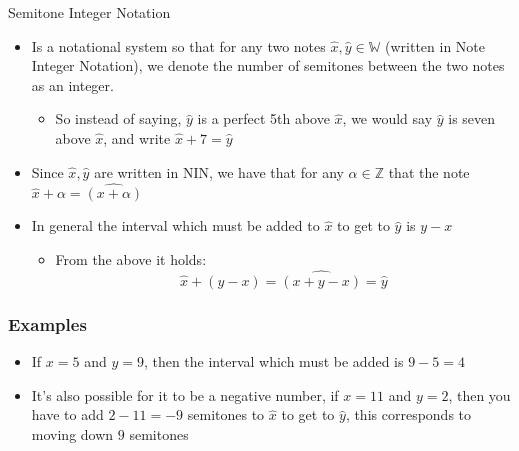 \documentclass{standalone}
\begin{document}
\begin{defn*}{Semitone Integer Notation}
  \begin{itemize}
    \item Is a notational system so that for any two notes $\widehat{x}, \widehat{y} \in \mathbb{W}$ (written in Note Integer Notation), we denote the number of semitones between the two notes as an integer. 
      \begin{itemize}
        \item So instead of saying, $\widehat{y}$ is a perfect 5th above $\widehat{x}$, we would say $\widehat{y}$ is seven above $\widehat{x}$, and write $\widehat{x}  +  7 = \widehat{y}$ 
      \end{itemize}
  \item Since $\widehat{x}, \widehat{y}$ are written in NIN, we have that for any $\alpha \in \mathbb{Z}$ that the note $\widehat{x}  +  \alpha = \widehat{\left( x  +  \alpha \right)}$ 
    \item In general the interval which must be added to $\widehat{x}$ to get to $\widehat{y}$ is $y - x$ 
      \begin{itemize}
        \item From the above it holds: 
          \[
            \widehat{x}  +  \left( y  -  x \right) = \widehat{\left( x  +  y  - x \right)} = \widehat{y}
          \]
      \end{itemize}
  \end{itemize}
    \subsubsection*{Examples}
    \begin{itemize}
      \item If $x = 5$ and $y = 9$, then the interval which must be added is $9 - 5 = 4$ 
      \item It's also possible for it to be a negative number, if $x = 11$ and $y = 2$, then you have to add $2  -  11 = -9$ semitones to $\widehat{x}$ to get to $\widehat{y}$, this corresponds to moving down $9$ semitones
    \end{itemize}

\end{defn*}
\end{document}
